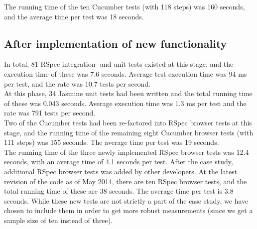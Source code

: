 The running time of the ten Cucumber tests (with 118 steps) was 160
seconds, and the average time per test was 18 seconds.\\


\subsection{After implementation of new functionality}

In total, 81 RSpec integration- and unit tests existed at this stage,
and the execution time of these was 7.6 seconds. Average test execution
time was 94 ms per test, and the rate was 10.7 tests per
second.\\

At this phase, 34 Jasmine unit tests had been written and the total
running time of these was 0.043 seconds. Average execution time was 1.3
ms per test and the rate was 791 tests per second.\\

Two of the Cucumber tests had been re-factored into RSpec browser tests
at this stage, and the running time of the remaining eight Cucumber
browser tests (with 111 steps) was 155 seconds. The average time per
test was 19 seconds.\\

The running time of the three newly implemented RSpec browser tests was
12.4 seconds, with an average time of 4.1 seconds per test. After the
case study, additional RSpec browser tests was added by other
developers. At the latest revision of the code as of May 2014, there are
ten RSpec browser tests, and the total running time of these are 38
seconds. The average time per test is 3.8 seconds. While these new tests
are not strictly a part of the case study, we have chosen to include
them in order to get more robust measurements (since we get a sample
size of ten instead of three).\\

